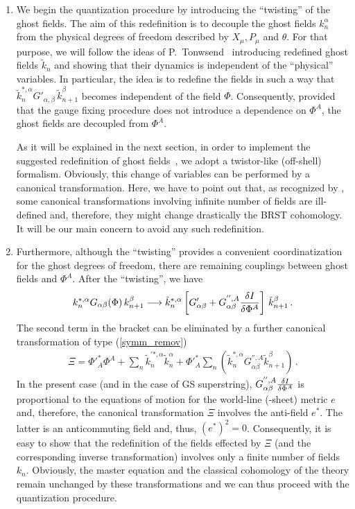 \documentclass[a4paper,12pt]{article}
\begin{document}
\begin{enumerate}
\item 
We begin the quantization procedure by introducing the ``twisting'' of the 
ghost fields. The aim of this redefinition is to decouple the ghost
fields $k^\alpha_n$ from the physical  
degrees of freedom described by  $X_\mu, P_\mu$ and $\theta$. For that
purpose, we will  
follow the ideas of P.~Tonwsend~\cite{3lectures} introducing redefined
ghost fields $\tilde{k}_n$  
and showing that their dynamics is independent of the ``physical'' variables. 
In particular, the idea is to redefine the fields in such a way that 
$\tilde{k}^{*,\alpha}_{n}  G'_{\alpha,\beta} \, \tilde{k}^\beta_{n+1}$ 
becomes independent of the field $\Phi$. Consequently, provided that
the gauge fixing  
procedure does not introduce a dependence on $\Phi^A$, the ghost
fields are decoupled from $\Phi^A$. 

As it will be explained in the next section, in order to implement the
suggested redefinition of ghost fields~\cite{3lectures}, we adopt a
twistor-like (off-shell) formalism. Obviously, this change of
variables can be performed by a canonical transformation. Here, we have
to point out that, as recognized by \cite{Bastianelli,kallosh}, some
canonical transformations involving infinite number of fields are
ill-defined and, therefore, they might change drastically the
BRST cohomology. It will be our main concern to avoid any such 
redefinition.
\item 
Furthermore, although the ``twisting'' provides a convenient
  coordinatization for the ghost degrees of freedom, there are
  remaining couplings between ghost fields and $\Phi^A$. After the
  ``twisting'', we have
\begin{eqnarray}
  \label{red.0}
   k^{*,\alpha}_{n} G_{\alpha \beta}(\Phi) \, k^\beta_{n+1} \longrightarrow  
  \tilde{k}^{*,\alpha}_{n} \left[ G'_{\alpha \beta} + 
    G^{'',A}_{ \alpha \beta} {\delta I \over \delta \Phi^A }\right]\,
  \tilde{k}^\beta_{n+1}\,.  
\end{eqnarray}
The second term in the bracket can be eliminated by a further
canonical transformation of type (\ref{symm_remov})
\begin{eqnarray}
  \label{red.1}
  \Xi = \Phi '^*_A\Phi ^A   + \sum_n   \tilde{k}^{'*,\alpha}_{n}
  \tilde{k}^\alpha_{n}   
+ \Phi '^*_A \sum_n \left( \tilde{k}^{*,\alpha}_{n} G^{'',A}_{\alpha
    \beta} \tilde{k}^\beta_{n+1} \right)\,.  
\end{eqnarray}
In the present case (and in the case of GS superstring),
$G^{'',A}_{\alpha \beta} {\delta I \over \delta \Phi^A }$ is
proportional to the equations of motion for the world-line (-sheet)
metric $e$ and, therefore, the canonical transformation $\Xi$ involves
the anti-field $e^*$. The latter is an anticommuting field and, thus,
$(e^*)^2 =0$. Consequently, it is easy to show that the redefinition
of the fields effected by $\Xi$ (and the corresponding inverse
transformation) involves only a finite number of fields $k_n$.
Obviously, the master equation and the classical cohomology of the
theory remain unchanged by these transformations and we can thus proceed
with the quantization procedure.


\end{enumerate}
\end{document}
